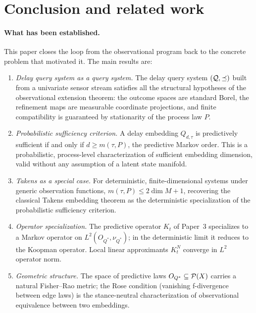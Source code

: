 \section{Conclusion and related work}\label{sec:conclusion}

\paragraph{What has been established.}
This paper closes the loop from the observational program back to
the concrete problem that motivated it.  The main results are:

\begin{enumerate}
  \item \emph{Delay query system as a query system.}
    The delay query system $(\mathcal{Q}, \preceq)$ built from a univariate
    sensor stream satisfies all the structural hypotheses of the
    observational extension theorem: the outcome spaces are standard
    Borel, the refinement maps are measurable coordinate projections,
    and finite compatibility is guaranteed by stationarity of the
    process law $P$.

  \item \emph{Probabilistic sufficiency criterion.}
    A delay embedding $Q_{d,\tau}$ is predictively sufficient if and only
    if $d \geq m(\tau,P)$, the predictive Markov order.  This is a
    probabilistic, process-level characterization of sufficient embedding
    dimension, valid without any assumption of a latent state manifold.

  \item \emph{Takens as a special case.}
    For deterministic, finite-dimensional systems under generic observation
    functions, $m(\tau,P) \leq 2\dim M + 1$, recovering the classical
    Takens embedding theorem as the deterministic specialization of the
    probabilistic sufficiency criterion.

  \item \emph{Operator specialization.}
    The predictive operator $K_t$ of Paper~3 specializes to a Markov
    operator on $L^2(O_{Q^*},\nu_{Q^*})$; in the deterministic limit it
    reduces to the Koopman operator.  Local linear approximants $K_t^N$
    converge in $L^2$ operator norm.

  \item \emph{Geometric structure.}
    The space of predictive laws $O_{Q^*} \subseteq \mathcal{P}(X)$ carries
    a natural Fisher--Rao metric; the Rose condition (vanishing
    f-divergence between edge laws) is the stance-neutral characterization
    of observational equivalence between two embeddings.
\end{enumerate}

